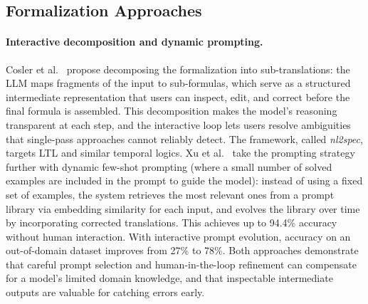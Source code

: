\subsection{Formalization Approaches}
\label{sec:sota-formalization}

\paragraph{Interactive decomposition and dynamic prompting.}
Cosler et al.~\cite{cosler2023nl2spec} propose decomposing the
formalization into sub-translations: the LLM maps fragments of the input
to sub-formulas, which serve as a structured intermediate representation
that users can inspect, edit, and correct before the final formula is
assembled. This decomposition makes the model's reasoning transparent at
each step, and the interactive loop lets users resolve ambiguities that
single-pass approaches cannot reliably detect. The framework, called
\textit{nl2spec}, targets LTL and similar temporal logics. Xu
et al.~\cite{xu2024nl2ltl} take the prompting strategy further with
dynamic few-shot prompting (where a small number of solved examples are
included in the prompt to guide the model): instead of using a fixed set
of examples, the system retrieves the most relevant ones from a prompt
library via embedding similarity for each input, and evolves the library
over time by incorporating corrected translations. This achieves up to
94.4\% accuracy without human interaction. With interactive prompt
evolution, accuracy on an out-of-domain dataset improves from 27\% to
78\%. Both approaches demonstrate that careful prompt selection and
human-in-the-loop refinement can compensate for a model's limited domain
knowledge, and that inspectable intermediate outputs are valuable for
catching errors early.

